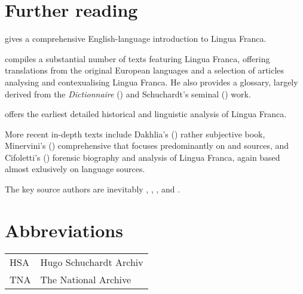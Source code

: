 \documentclass[output=paper]{langsci/langscibook}
\begin{document}
\section*{Further reading}
\begin{furtherreading}
\item[\citet{Nolan2018}] gives a comprehensive English-language introduction to Lingua Franca.
\item[\citet{Corré2005}] compiles a substantial number of texts featuring Lingua Franca, offering translations from the original European languages and a selection of articles analysing and contexualising Lingua Franca. He also provides a glossary, largely derived from the \textit{Dictionnaire} (\citeyear{Anonymous1830}) and Schuchardt’s seminal (\citeyear{Schuchardt1909}) work.
\item[\citet{Schuchardt1909}] offers the earliest detailed historical and linguistic analysis of Lingua Franca.  
\item[More recent in-depth texts] include Dakhlia's (\citeyear{Dakhlia2008}) rather subjective book, Minervini's (\citeyear{Minervini1996}) comprehensive  that focuses predominantly on  and  sources, and Cifoletti's (\citeyear{Cifoletti2004}) forensic biography and analysis of Lingua Franca, again based almost exlusively on  language sources.
\item[The key source authors] are inevitably \citet{Haedo1612}, \citet{Broughton1839}, \citet{Pananti1841}, and \citet{Frank1850}.
\end{furtherreading}

\section*{Abbreviations}	

\begin{tabularx}{.5\textwidth}{@{}lQ@{}}
HSA & Hugo Schuchardt Archiv\\
TNA & The National Archive \\ 
\end{tabularx}%

	{\sloppy\printbibliography[heading=subbibliography,notkeyword=this]}
\end{document}
